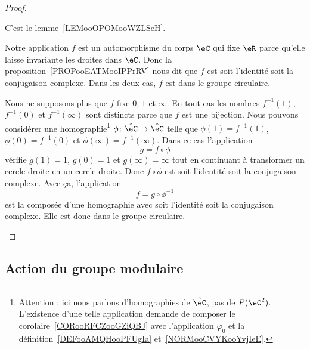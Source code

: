 \begin{proof}
\begin{subproof}
\begin{subproof}

			C'est le lemme~\ref{LEMooOPOMooWZLSeH}.


			Notre application \( f\) est un automorphisme du corps \( \eC\) qui fixe \( \eR\) parce qu'elle laisse invariante les droites dans \( \eC\). Donc la proposition~\ref{PROPooEATMooIPPrRV} nous dit que \( f\) est soit l'identité soit la conjugaison complexe. Dans les deux cas, \( f\) est dans le groupe circulaire.

		\end{subproof}


		Nous ne supposons plus que \( f\) fixe \( 0\), \( 1\) et \( \infty\). En tout cas les nombres \( f^{-1}(1)\), \( f^{-1}(0)\) et \( f^{-1}(\infty)\) sont distincts parce que \( f\) est une bijection. Nous pouvons considérer une homographie\footnote{Attention : ici nous parlons d'homographies de \( \hat \eC\), pas de \( P(\eC^2)\). L'existence d'une telle application demande de composer le corolaire~\ref{CORooRFCZooGZiQBJ} avec l'application \( \varphi_0\) et la définition~\ref{DEFooAMQHooPFUgIa} et~\ref{NORMooCVYKooYvjIeE}.} \( \phi\colon \hat \eC\to \hat \eC\) telle que \( \phi(1)=f^{-1}(1)\), \( \phi(0)=f^{-1}(0)\) et \( \phi(\infty)=f^{-1}(\infty)\). Dans ce cas l'application
		\begin{equation}
			g=f\circ\phi
		\end{equation}
		vérifie \( g(1)=1\), \( g(0)=1\) et \( g(\infty)=\infty\) tout en continuant à transformer un cercle-droite en un cercle-droite. Donc \( f\circ\phi\) est soit l'identité soit la conjugaison complexe. Avec ça, l'application
		\begin{equation}
			f=g\circ\phi^{-1}
		\end{equation}
		est la composée d'une homographie avec soit l'identité soit la conjugaison complexe. Elle est donc dans le groupe circulaire.
	\end{subproof}
\end{proof}


\subsection{Action du groupe modulaire}

